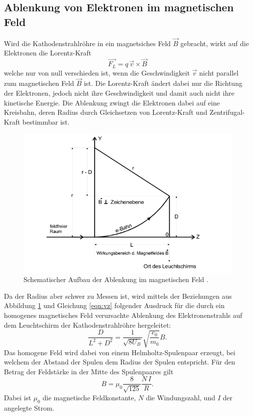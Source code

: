 \subsection{Ablenkung von Elektronen im magnetischen Feld}
\label{sec:bfeld}
Wird die Kathodenstrahlröhre in ein magnetsiches Feld $\vec{B}$ gebracht, wirkt auf die Elektronen die Lorentz-Kraft
\begin{equation}
  \vec{F_L} =  q \, \vec{v} \times \vec{B}
  \label{eqn:Lorentz}
\end{equation}
welche nur von null verschieden ist, wenn die Geschwindigkeit $\vec{v}$ nicht parallel zum magnetischen Feld $\vec{B}$ ist.
Die Lorentz-Kraft ändert dabei nur die Richtung der Elektronen, jedoch nicht ihre Geschwindigkeit und damit auch nicht ihre kinetische Energie.
Die Ablenkung zwingt die Elektronen dabei auf eine Kreisbahn, deren Radius durch Gleichsetzen von Lorentz-Kraft und Zentrifugal-Kraft bestimmbar ist.
\begin{figure}
  \centering
  \includegraphics{images/bfeld.png}
  \caption{Schematischer Aufbau der Ablenkung im magnetischen Feld \cite{502}.}
  \label{fig:bfeld}
\end{figure}
Da der Radius aber schwer zu Messen ist, wird mittels der Beziehungen aus Abbildung \ref{fig:bfeld} und Gleichung \eqref{eqn:vz} folgender Ausdruck für die durch ein homogenes magnetisches Feld verursachte
Ablenkung des Elektronenstrahls auf dem Leuchtschirm der Kathodenstrahlröhre hergeleitet:
\begin{equation}
  \frac{D}{L^2 + D^2} = \frac{1}{\sqrt{8 U_B}} \sqrt{\frac{e_0}{m_0}} B .
  \label{eqn:AblenkungBFeld}
\end{equation}
Das homogene Feld wird dabei von einem Helmholtz-Spulenpaar erzeugt, bei welchem der Abstand der Spulen dem Radius der Spulen entspricht.
Für den Betrag der Feldstärke in der Mitte des Spulenpaares gilt
\begin{equation}
  B = {\mu}_0 \frac{8}{\sqrt{125}} \frac{N \, I}{R} .
  \label{eqn:hemlholtz}
\end{equation}
Dabei ist ${\mu}_0$ die magnetische Feldkonstante, $N$ die Windungszahl, und $I$ der angelegte Strom.
